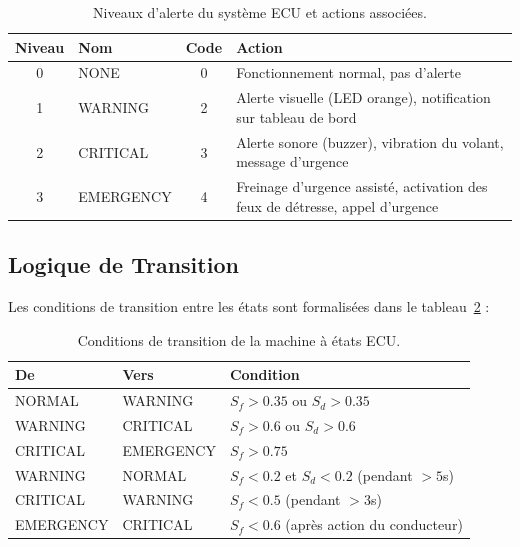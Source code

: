 \documentclass[12pt,a4paper,twoside]{report}
\begin{document}
\begin{table}[H]
\centering
\caption{Niveaux d'alerte du système ECU et actions associées.}
\label{tab:alert_levels}
\renewcommand{\arraystretch}{1.4}
\begin{tabularx}{\textwidth}{|c|l|c|X|}
\hline
\rowcolor{stellantisblue!15}
\textbf{Niveau} & \textbf{Nom} & \textbf{Code} & \textbf{Action} \\
\hline
\cellcolor{green!20} 0 & NONE & 0 & Fonctionnement normal, pas d'alerte \\
\hline
\cellcolor{alertyellow!30} 1 & WARNING & 2 & Alerte visuelle (LED orange), notification sur tableau de bord \\
\hline
\cellcolor{alertorange!30} 2 & CRITICAL & 3 & Alerte sonore (buzzer), vibration du volant, message d'urgence \\
\hline
\cellcolor{alertred!30} 3 & EMERGENCY & 4 & Freinage d'urgence assisté, activation des feux de détresse, appel d'urgence \\
\hline
\end{tabularx}
\end{table}

\subsection{Logique de Transition}

Les conditions de transition entre les états sont formalisées dans le tableau~\ref{tab:transitions} :

\begin{table}[H]
\centering
\caption{Conditions de transition de la machine à états ECU.}
\label{tab:transitions}
\renewcommand{\arraystretch}{1.3}
\begin{tabularx}{\textwidth}{|l|l|X|}
\hline
\rowcolor{stellantisblue!15}
\textbf{De} & \textbf{Vers} & \textbf{Condition} \\
\hline
NORMAL & WARNING & $S_f > 0.35$ ou $S_d > 0.35$ \\
\hline
WARNING & CRITICAL & $S_f > 0.6$ ou $S_d > 0.6$ \\
\hline
CRITICAL & EMERGENCY & $S_f > 0.75$ \\
\hline
WARNING & NORMAL & $S_f < 0.2$ et $S_d < 0.2$ (pendant $> 5$s) \\
\hline
CRITICAL & WARNING & $S_f < 0.5$ (pendant $> 3$s) \\
\hline
EMERGENCY & CRITICAL & $S_f < 0.6$ (après action du conducteur) \\
\hline
\end{tabularx}
\end{table}
\end{document}
